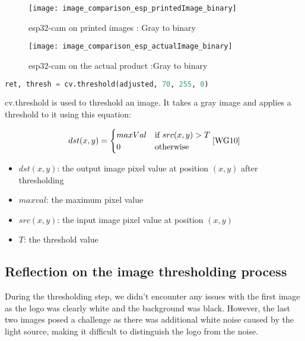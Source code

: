 \FloatBarrier
\FloatBarrier
\begin{figure}[h]
\FloatBarrier
         \centering
        \texttt{[image: image\_comparison\_esp\_printedImage\_binary]}
   
        \caption{esp32-cam on printed images : Gray to binary}
        \label{fig:Phone's images : Gray to binary}
\FloatBarrier
    \end{figure}


\FloatBarrier
\FloatBarrier
\begin{figure}[h]
\FloatBarrier
         \centering
        \texttt{[image: image\_comparison\_esp\_actualImage\_binary]}
   
        \caption{esp32-cam on the actual product :Gray to binary}
        \label{fig:Phone's images :  Gray to binary}
\FloatBarrier
    \end{figure}


\FloatBarrier 
\begin{lstlisting}[language=Python]
 ret, thresh = cv.threshold(adjusted, 70, 255, 0)
\end{lstlisting}
 cv.threshold is used to threshold an image. It takes a gray image and applies a threshold to it \cite{WG10} using this equation:

\begin{equation}
dst(x,y) = \begin{cases}
maxVal &\text{if } src(x,y) > T \\
0 &\text{otherwise}
\end{cases}
\cite{WG10}
\end{equation}
\begin{itemize}
\item $dst(x,y)$: the output image pixel value at position $(x,y)$ after thresholding
\item $maxval$: the maximum pixel value 
\item $src(x,y)$: the input image pixel value at position $(x,y)$
\item $T$: the threshold value 
\end{itemize}
\subsection{Reflection on the image thresholding process}
During the thresholding step, we didn't encounter any issues with the first image as the logo was clearly white and the background was black. However, the last two images posed a challenge as there was additional white noise caused by the light source, making it difficult to distinguish the logo from the noise.
